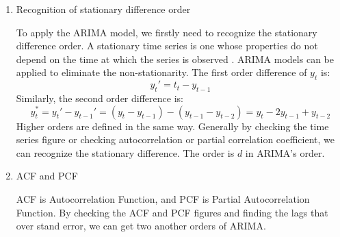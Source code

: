 \begin{enumerate}
    \item{Recognition of stationary difference order}\par
    To apply the ARIMA model, we firstly need to recognize the stationary difference order. A stationary time series is one whose properties do not depend on the time at which the series is observed \cite{otext}. ARIMA models can be applied to eliminate the non-stationarity. The first order difference of $y_t$ is:
    \begin{equation}
    y_t'=t_t-y_{t-1}
    \end{equation}
    Similarly, the second order difference is:
    \begin{equation}
    y_t^*=y_t'-y_{t-1}'=(y_t-y_{t-1})-(y_{t-1}-y_{t-2})=y_t-2y_{t-1}+y_{t-2}
    \end{equation}
    Higher orders are defined in the same way. Generally by checking the time series figure or checking autocorrelation or partial correlation coefficient, we can recognize the stationary difference. The order is $d$ in ARIMA's order.
    \item{ACF and PCF}\par
    ACF is Autocorrelation Function, and PCF is Partial Autocorrelation Function. By checking the ACF and PCF figures and finding the lags that over stand error, we can get two another orders of ARIMA.
\end{enumerate}


